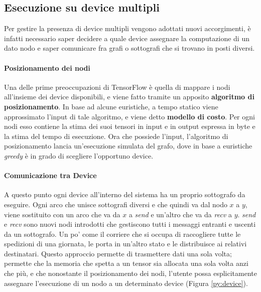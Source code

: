 \documentclass[DIV=calc, paper=a4, fontsize=11pt]{scrartcl}	 %
\begin{document}
\begin{multicols}{2}
			\subsection{Esecuzione su device multipli}
				Per gestire la presenza di device multipli vengono adottati nuovi accorgimenti, è infatti necessario saper decidere a quale device assegnare la computazione di un dato nodo e saper comunicare fra grafi o sottografi che si trovano in posti diversi.
				\paragraph*{Posizionamento dei nodi} Una delle prime preoccupazioni di TensorFlow è quella di mappare i nodi all'insieme dei device disponibili, e viene fatto tramite un apposito \textbf{algoritmo di posizionamento}. In base ad alcune euristiche, a tempo statico viene approssimato l'input di tale algoritmo, e viene detto \textbf{modello di costo}. Per ogni nodi esso contiene la stima dei suoi tensori in input e in output espressa in byte e la stima del tempo di esecuzione. Ora che possiede l'input, l'algoritmo di posizionamento lancia un'esecuzione simulata del grafo, dove in base a euristiche \textit{greedy} è in grado di scegliere l'opportuno device.
				\paragraph{Comunicazione tra Device} A questo punto ogni device all'interno del sistema ha un proprio sottografo da eseguire. Ogni arco che unisce sottografi diversi e che quindi va dal nodo $x$ a $y$, viene sostituito con un arco che va da $x$ a \textit{send} e un'altro che va da \textit{recv} a $y$. \textit{send} e \textit{recv} sono nuovi nodi introdotti che gestiscono tutti i messaggi entranti e uscenti da un sottografo. Un po' come il corriere che si occupa di raccogliere tutte le spedizioni di una giornata, le porta in un'altro stato e le distribuisce ai relativi destinatari. Questo approccio permette di trasmettere dati una sola volta; permette che la memoria che spetta a un tensor sia allocata una sola volta anzi che più, e che nonostante il posizionamento dei nodi, l'utente possa esplicitamente assegnare l'esecuzione di un nodo a un determinato device (Figura \ref{py:device}).

\end{multicols}
\end{document}
